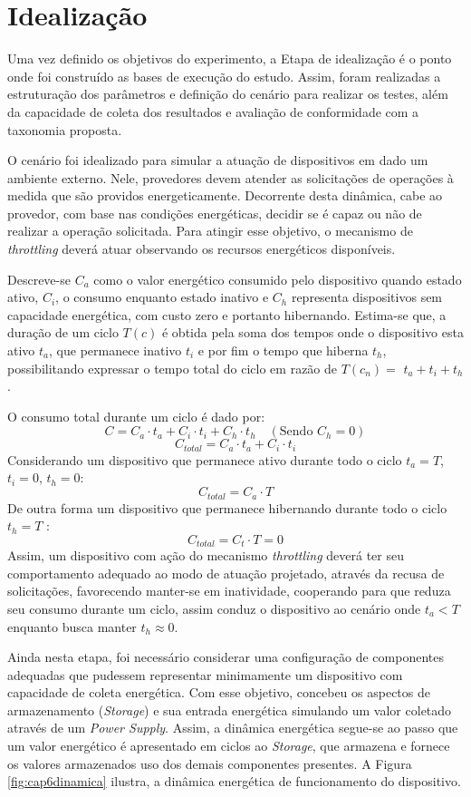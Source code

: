 \section{Idealização}
\label{cap6:idealizacao}
Uma vez definido os objetivos do experimento, a Etapa de idealização é o ponto onde foi construído as bases de execução do estudo. Assim, foram realizadas a estruturação  dos parâmetros e definição do cenário para realizar os testes, além da capacidade de coleta dos resultados e avaliação de conformidade com a taxonomia proposta.

O cenário foi idealizado para simular a atuação de dispositivos em dado um ambiente externo. Nele, provedores devem atender as solicitações de operações à medida que são providos energeticamente. Decorrente desta dinâmica, cabe ao provedor, com base nas condições energéticas, decidir se é capaz ou não de realizar a operação solicitada. Para atingir esse objetivo, o mecanismo de \textit{throttling} deverá atuar observando os recursos energéticos disponíveis.

Descreve-se \( C_a \) como o valor energético consumido pelo dispositivo quando estado ativo, \( C_i \), o consumo enquanto estado inativo e \( C_h \) representa dispositivos sem capacidade energética, com custo zero e portanto hibernando. Estima-se que, a duração de um ciclo $T(c)$ é obtida pela soma dos tempos onde o dispositivo esta ativo \( t_a \), que permanece inativo \( t_i \) e por fim o tempo que hiberna \( t_h \), possibilitando expressar o tempo total do ciclo em razão de $T(c_n) = $ \( t_a + t_i + t_h \).

O consumo total durante um ciclo é dado por:
\[C = C_a \cdot t_a + C_i \cdot t_i + C_h \cdot t_h \quad (\text{Sendo }C_h = 0)\]
\[C_{total} = C_a \cdot t_a + C_i \cdot t_i\]
Considerando um dispositivo que permanece ativo durante todo o ciclo \( t_a = T \), \( t_i = 0 \), \( t_h = 0 \):
\[ C_{total} = C_a \cdot T \]
De outra forma um dispositivo que permanece hibernando durante todo o ciclo \( t_h = T \) :
\[ C_{total} = C_t \cdot T = 0 \]
Assim, um dispositivo com ação do mecanismo \textit{throttling} deverá ter seu comportamento adequado ao modo de atuação projetado, através da recusa de solicitações, favorecendo manter-se em inatividade, cooperando para que reduza seu consumo durante um ciclo, assim conduz o dispositivo ao cenário onde \( t_a < T \) enquanto busca manter $t_h \approx 0$.

Ainda nesta etapa, foi necessário considerar uma configuração de componentes adequadas que pudessem representar minimamente um dispositivo com capacidade de coleta energética. Com esse objetivo, concebeu os aspectos de armazenamento (\textit{Storage}) e sua entrada energética simulando um valor coletado através de um \textit{Power Supply}. Assim, a dinâmica energética segue-se ao passo que um valor energético é apresentado em ciclos ao \textit{Storage}, que armazena e fornece os valores armazenados uso dos demais componentes presentes. A Figura \ref{fig:cap6dinamica} ilustra, a dinâmica energética de funcionamento do dispositivo.

